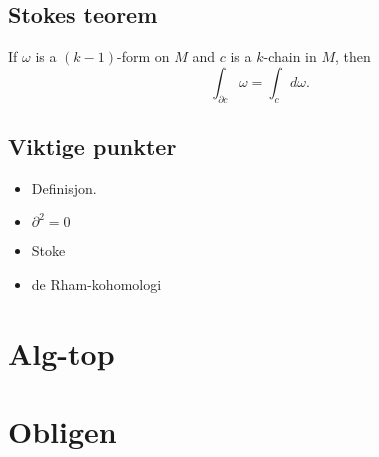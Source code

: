 \documentclass[11pt, english]{article}
\begin{document}
\subsection{Stokes teorem}

\begin{thm}[Stoke]
If $\omega$ is a $(k-1)$-form on $M$ and $c$ is a $k$-chain in $M$, then
$$
\int_{\partial c} \omega = \int_c d \omega.
$$
\end{thm}

\subsection{Viktige punkter}

\begin{itemize}
\item Definisjon.
\item $\partial^2=0$
\item Stoke
\item de Rham-kohomologi
\end{itemize}

\section{Alg-top}



\section{Obligen}
\end{document}
